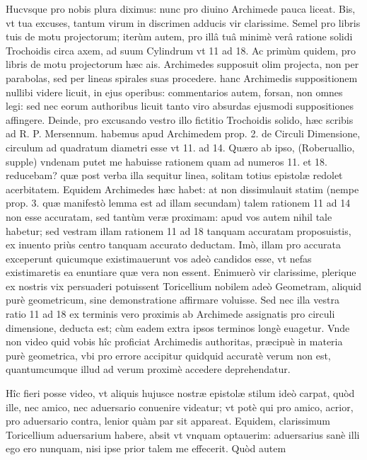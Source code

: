 \documentclass[11pt,a4paper]{article}
\begin{document}
Hucvsque pro nobis plura diximus: nunc pro diuino Archimede pauca liceat. Bis, vt tua excuses, tantum virum in discrimen adducis vir clarissime. Semel pro libris tuis de motu projectorum; iterùm autem, pro illâ tuâ minimè verâ ratione solidi Trochoidis circa axem, ad suum Cylindrum vt 11 ad 18. Ac primùm quidem, pro libris de motu projectorum hæc ais. Archimedes supposuit olim projecta, non per parabolas, sed per lineas spirales suas procedere. hanc Archimedis suppositionem nullibi videre licuit, in ejus operibus: commentarios autem, forsan, non omnes legi: sed nec eorum authoribus licuit tanto viro absurdas ejusmodi suppositiones affingere. Deinde, pro excusando vestro illo fictitio Trochoidis solido, hæc scribis ad R. P. Mersennum. habemus apud Archimedem prop. 2. de Circuli Dimensione, circulum ad quadratum diametri esse vt 11. ad 14. Quæro ab ipso, (Roberuallio, supple) vndenam putet me habuisse rationem quam ad numeros 11. et 18. reducebam? quæ post verba illa sequitur linea, solitam totius epistolæ redolet acerbitatem. Equidem Archimedes hæc habet: at non dissimulauit statim (nempe prop. 3. quæ manifestò lemma est ad illam secundam) talem rationem 11 ad 14 non esse accuratam, sed tantùm veræ proximam: apud vos autem nihil tale habetur; sed vestram illam rationem 11 ad 18 tanquam accuratam proposuistis, ex inuento priùs centro tanquam accurato deductam. Imò, illam pro accurata exceperunt quicumque existimauerunt vos adeò candidos esse, vt nefas existimaretis ea enuntiare quæ vera non essent. Enimuerò vir clarissime, plerique ex nostris vix persuaderi potuissent Toricellium nobilem adeò Geometram, aliquid purè geometricum, sine demonstratione affirmare voluisse. Sed nec illa vestra ratio 11 ad 18 ex terminis vero proximis ab Archimede assignatis pro circuli dimensione, deducta est; cùm eadem extra ipsos terminos longè euagetur. Vnde non video quid vobis hîc proficiat Archimedis authoritas, præcipuè in materia purè geometrica, vbi pro errore accipitur quidquid accuratè verum non est, quantumcumque illud ad verum proximè accedere deprehendatur.

Hîc fieri posse video, vt aliquis hujusce nostræ epistolæ stilum ideò carpat, quòd ille, nec amico, nec aduersario conuenire videatur; vt potè qui pro amico, acrior, pro aduersario contra, lenior quàm par sit appareat. Equidem, clarissimum Toricellium aduersarium habere, absit vt vnquam optauerim: aduersarius sanè illi ego ero nunquam, nisi ipse prior talem me effecerit. Quòd autem
\end{document}
